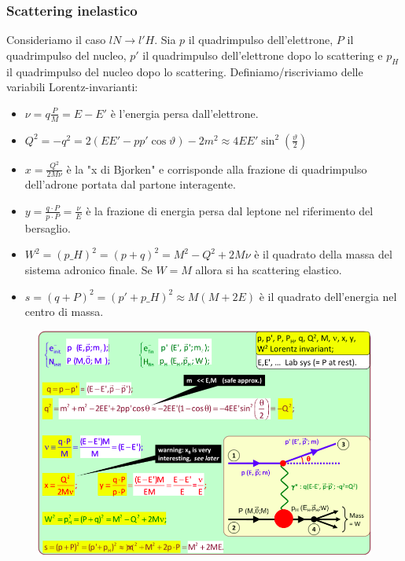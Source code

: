 \subsubsection{Scattering inelastico}
Consideriamo il caso $lN\to l'H$. Sia $p$ il quadrimpulso dell'elettrone, $P$ il quadrimpulso del nucleo, $p'$ il quadrimpulso dell'elettrone dopo lo scattering e $p_H$ il quadrimpulso del nucleo dopo lo scattering. Definiamo/riscriviamo delle variabili Lorentz-invarianti:
\begin{itemize}
    \item $\nu=q\frac PM=E-E'$ è l'energia persa dall'elettrone.
    \item $Q^2=-q^2=2(EE'-pp'\cos\vartheta)-2m^2\approx4EE'\sin^2(\frac\vartheta2)$ 
    \item $x=\frac{Q^2}{2M\nu}$ è la "x di Bjorken" e corrisponde alla frazione di quadrimpulso dell'adrone portata dal partone interagente.
    \item $y=\frac{q\cdot P}{p\cdot P}=\frac\nu E$ è la frazione di energia persa dal leptone nel riferimento del bersaglio.
    \item $W^2=(p\_H)^2=(p+q)^2=M^2-Q^2+2M\nu$ è il quadrato della massa del sistema adronico finale. Se $W=M$ allora si ha scattering elastico.
    \item $s=(q+P)^2=(p'+p\_H)^2\approx M(M+2E)$ è il quadrato dell'energia nel centro di massa.
\end{itemize}
\begin{figure}[H]
    \centering
    \includegraphics[width=\textwidth]{immagini/fig_conti_kinem.png}
\end{figure}
